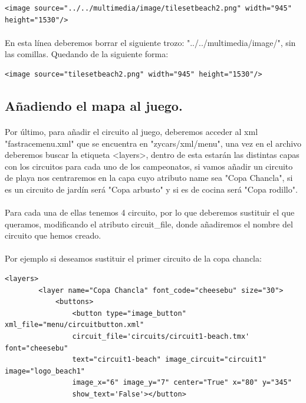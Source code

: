 \begin{lstlisting}[style=XML]
<image source="../../multimedia/image/tilesetbeach2.png" width="945" height="1530"/>
\end{lstlisting}

\paragraph{}
En esta línea deberemos borrar el siguiente trozo: "../../multimedia/image/", sin las comillas. Quedando de la siguiente forma:

\begin{lstlisting}[style=XML]
<image source="tilesetbeach2.png" width="945" height="1530"/>
\end{lstlisting}

\subsection{Añadiendo el mapa al juego.}

\paragraph{}
Por último, para añadir el circuito al juego, deberemos acceder al xml "fastracemenu.xml" que se encuentra en 
"zycars/xml/menu", una vez en el archivo deberemos buscar la etiqueta <layers>,
dentro de esta estarán las distintas capas
con los circuitos para cada uno de los campeonatos, si vamos añadir un circuito de playa nos centraremos en la capa cuyo atributo
name sea "Copa Chancla", si es un circuito de jardín será "Copa arbusto" y si es de cocina será "Copa rodillo".

\paragraph{}
Para cada una de ellas tenemos 4 circuito, por lo que deberemos sustituir el que queramos, modificando el atributo circuit\_file,
donde añadiremos el nombre del circuito que hemos creado. 

\paragraph{}
Por ejemplo si deseamos sustituir el primer circuito de la copa chancla:

\begin{lstlisting}[style=XML]
    <layers>
        <layer name="Copa Chancla" font_code="cheesebu" size="30">
            <buttons>
                <button type="image_button" xml_file="menu/circuitbutton.xml" 
                circuit_file='circuits/circuit1-beach.tmx' font="cheesebu" 
                text="circuit1-beach" image_circuit="circuit1" image="logo_beach1" 
                image_x="6" image_y="7" center="True" x="80" y="345" 
                show_text='False'></button>
\end{lstlisting}

